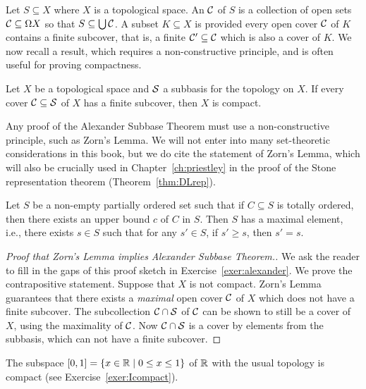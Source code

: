 Let $S\subseteq X$ where $X$ is a topological space. An  $\mathcal{C}$ of $S$ is a collection of open sets $\mathcal{C}\subseteq\Omega X$ so that $S\subseteq \bigcup\mathcal{C}$. A subset $K\subseteq X$ is  provided every open cover $\mathcal{C}$ of $K$ contains a finite subcover, that is, a finite $\mathcal{C}'\subseteq\mathcal{C}$ which is also a cover of $K$. We now recall a result, which requires a non-constructive principle, and is often useful for proving compactness.

\begin{alexanderthm}\label{lem:alexander}
Let $X$ be a topological space and $\mathcal{S}$ a subbasis for the topology on $X$. If every cover $\mathcal{C}\subseteq\mathcal{S}$ of $X$ has a finite subcover, then $X$ is compact.
\end{alexanderthm}

Any proof of the Alexander Subbase Theorem must use a non\hyp{}constructive principle, such as Zorn's Lemma. We will not enter into many set-theoretic considerations in this book, but we do cite the statement of Zorn's Lemma, which will also be crucially used in Chapter~\ref{ch:priestley} in the proof of the Stone representation theorem (Theorem~\ref{thm:DLrep}).

\begin{zornslemma}\label{lem:zorn}
Let $S$ be a non-empty partially ordered set such that if $C \subseteq S$ is totally ordered, then there exists an upper bound $c$ of $C$ in $S$. Then $S$ has a maximal element, i.e., there exists $s \in S$ such that for any $s' \in S$, if $s' \geq s$, then $s' = s$.
\end{zornslemma}

\begin{proof}[Proof that Zorn's Lemma implies Alexander Subbase Theorem.] We ask the reader to fill in the gaps of this proof sketch in Exercise~\ref{exer:alexander}. We prove the contrapositive statement. Suppose that $X$ is not compact. Zorn's Lemma guarantees that there exists a \emph{maximal} open cover $\mathcal{C}$ of $X$ which does not have a finite subcover. The subcollection $\mathcal{C} \cap \mathcal{S}$ of $\mathcal{C}$ can be shown to still be a cover of $X$, using the maximality of $\mathcal{C}$. Now $\mathcal{C} \cap \mathcal{S}$ is a cover by elements from the subbasis, which can not have a finite subcover.
\end{proof}

\begin{example}\label{exp:compact}
The subspace $[0,1]=\{x\in \mathbb{R}\mid 0\leq x\leq 1\}$ of $\mathbb{R}$ with the usual topology is compact (see Exercise~\ref{exer:Icompact}).
\end{example}

